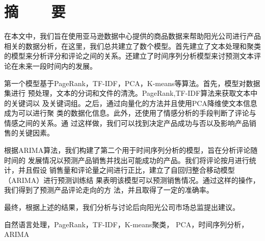 \renewcommand{\baselinestretch}{1.5}
\fontsize{12pt}{13pt}\selectfont

\chapter[摘要]{摘~~~~要}
在本文中，我们旨在使用亚马逊数据中心提供的商品数据来帮助阳光公司进行产品
相关的数据分析，在这里，我们总共建立了数个模型。首先建立了文本处理和聚类
的模型来分析评分和评论之间的关系。还建立了时间序列分析模型来讨预测文本评
论在未来一段时间内的发展。

第一个模型基于PageRank，TF-IDF，PCA，K-means等算法。首先，模型对数据集进行
预处理，文本的分词和文件的清洗。PageRank,TF-IDF算法来获取文本中的关键词以
及关键词组。之后，通过向量化的方法并且使用PCA降维使文本信息成为可以进行聚
类的数据化信息。此外，还使用了情感分析的手段判断了评论与情感之间的关系。通
过这样做，我们可以找到决定产品成功与否以及影响产品销售的关键因素。

根据ARIMA算法，我们构建了第二个用于时间序列分析的模型，旨在分析评论随时间的
发展情况以预测产品销售并找出可能成功的产品。我们将评论按月进行统计，并且假设
销售量和评论量之间进行正比，建立了自回归整合移动模型（ARIMA）进行预测训练结
果表明该模型可以预测销售情况。通过这样的操作，我们得到了预测产品评论走向的方
法，并且取得了一定的准确率。

最终，根据上述的结果，我们分析与讨论后向阳光公司市场总监提出建议。


\vspace{1em}
 \quad 自然语言处理，PageRank，TF-IDF，K-means聚类，
PCA，时间序列分析，ARIMA

\clearpage
\endinput
